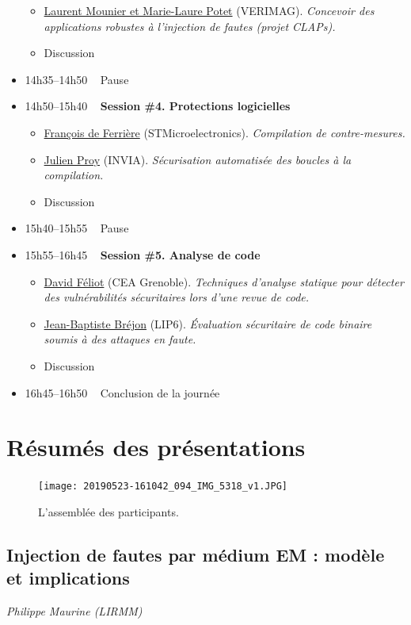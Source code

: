 \documentclass[a4paper,11pt]{article}
\begin{document}
\begin{itemize}
\begin{itemize}
\item \hyperref[sec:org7a3ac6d]{Laurent Mounier et Marie-Laure Potet} (VERIMAG). \emph{Concevoir des applications robustes à l’injection de fautes (projet CLAPs).}
\item Discussion
\end{itemize}
\item 14h35--14h50   Pause
\item 14h50--15h40   \textbf{Session \#4. Protections logicielles}
\begin{itemize}
\item \hyperref[sec:org0ff8a16]{François de Ferrière} (STMicroelectronics). \emph{Compilation de contre-mesures.}
\item \hyperref[sec:org0394842]{Julien Proy} (INVIA). \emph{Sécurisation automatisée des boucles à la compilation.}
\item Discussion
\end{itemize}
\item 15h40--15h55   Pause
\item 15h55--16h45   \textbf{Session \#5. Analyse de code}
\begin{itemize}
\item \hyperref[sec:org0bcbeb6]{David Féliot} (CEA Grenoble). \emph{Techniques d’analyse statique pour détecter des vulnérabilités sécuritaires lors d’une revue de code.}
\item \hyperref[sec:org89850c6]{Jean-Baptiste Bréjon} (LIP6). \emph{Évaluation sécuritaire de code binaire soumis à des attaques en faute.}
\item Discussion
\end{itemize}
\item 16h45--16h50   Conclusion de la journée
\end{itemize}


\pagebreak
\section{Résumés des présentations}
\label{sec:org5b88f9f}
\begin{figure}[t]
\centering
\texttt{[image: 20190523-161042\_094\_IMG\_5318\_v1.JPG]}
\caption{L'assemblée des participants.}
\end{figure}

\subsection{Injection de fautes par médium EM : modèle et implications}
\label{sec:org6eab62c}
\emph{Philippe Maurine (LIRMM)}
\end{document}
